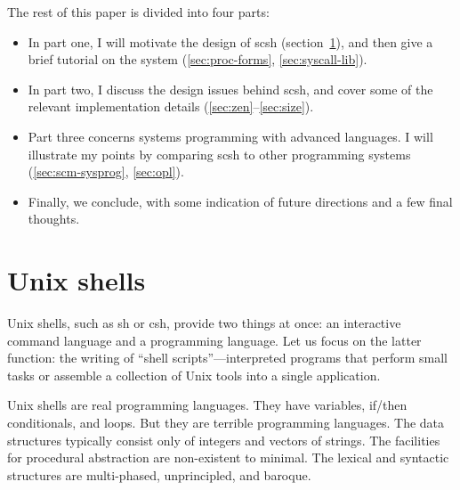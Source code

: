 The rest of this paper is divided into four parts:
\begin{itemize}
\item In part one, I will motivate the design of scsh 
	(section~\ref{sec:shells}), and then give a brief
	tutorial on the system 
	(\ref{sec:proc-forms}, \ref{sec:syscall-lib}).
\item In part two, I discuss the design issues behind scsh, 
	and cover some of the relevant implementation details
	(\ref{sec:zen}--\ref{sec:size}).
\item Part three concerns systems programming with advanced languages.
      I will illustrate my points by comparing scsh to other {\Unix}
      programming systems (\ref{sec:scm-sysprog}, \ref{sec:opl}).
\item Finally, we conclude, with some indication of future directions
      and a few final thoughts.
\end{itemize}


\section{Unix shells}
\label{sec:shells}
Unix shells, such as sh or csh, provide two things at once: an interactive
command language and a programming language. Let us focus on the latter
function: the writing of ``shell scripts''---interpreted programs
that perform small tasks or assemble a collection of Unix tools into
a single application.

Unix shells are real programming languages. They have variables, if/then
conditionals, and loops. But they are terrible programming languages.  The
data structures typically consist only of integers and vectors of strings.
The facilities for procedural abstraction are non-existent to minimal. The
lexical and syntactic structures are multi-phased, unprincipled, and baroque.

